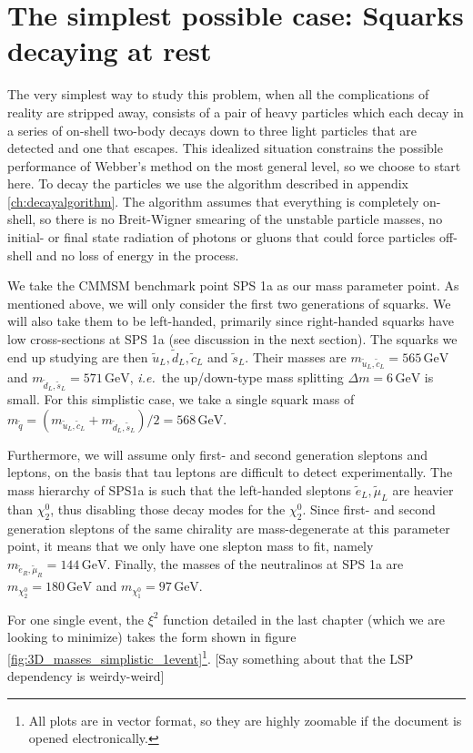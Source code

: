 \documentclass[twoside,english]{uiofysmaster}
\begin{document}
\section{The simplest possible case: Squarks decaying at rest}
The very simplest way to study this problem, when all the complications of reality are stripped away, consists of a pair of heavy particles which each decay in a series of on-shell two-body decays down to three light particles that are detected and one that escapes. This idealized situation constrains the possible performance of Webber's method on the most general level, so we choose to start here. To decay the particles we use the algorithm described in appendix \ref{ch:decayalgorithm}. The algorithm assumes that everything is completely on-shell, so there is no Breit-Wigner smearing of the unstable particle masses, no initial- or final state radiation of photons or gluons that could force particles off-shell and no loss of energy in the process.

We take the CMMSM benchmark point SPS 1a \cite{Allanach:2002nj} as our mass parameter point. As mentioned above, we will only consider the first two generations of squarks. We will also take them to be left-handed, primarily since right-handed squarks have low cross-sections at SPS 1a (see discussion in the next section). The squarks we end up studying are then $\tilde u_L, \tilde d_L, \tilde c_L$ and $\tilde s_L$. Their masses are $m_{\tilde u_L, \tilde c_L} = 565 \,\mathrm{GeV}$ and $m_{\tilde d_L, \tilde s_L} = 571 \, \mathrm{GeV}$, {\it i.e.}\ the up/down-type mass splitting $\Delta m = 6 \, \mathrm{GeV}$ is small. For this simplistic case, we take a single squark mass of $m_{\tilde q} = (m_{\tilde u_L, \tilde c_L}+m_{\tilde d_L, \tilde s_L})/2 = 568 \, \mathrm{GeV}$. 

Furthermore, we will assume only first- and second generation sleptons and leptons, on the basis that tau leptons are difficult to detect experimentally. The mass hierarchy of SPS1a is such that the left-handed sleptons $\tilde e_L, \tilde \mu_L$ are heavier than $\chi_2^0$, thus disabling those decay modes for the $\chi_2^0$. Since first- and second generation sleptons of the same chirality are mass-degenerate at this parameter point, it means that we only have one slepton mass to fit, namely $m_{\tilde e_R, \tilde \mu_R} = 144 \, \mathrm{GeV}$. Finally, the masses of the neutralinos at SPS 1a are $m_{\chi_2^0} = 180 \, \mathrm{GeV}$ and $m_{\chi_1^0} = 97 \, \mathrm{GeV}$. 

For one single event, the $\xi^2$ function detailed in the last chapter (which we are looking to minimize) takes the form shown in figure \ref{fig:3D_masses_simplistic_1event}\footnote{All plots are in vector format, so they are highly zoomable if the document is opened electronically.}. [Say something about that the LSP dependency is weirdy-weird]
\end{document}
